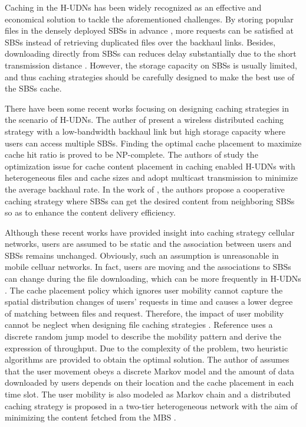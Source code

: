 \documentclass[conference]{IEEEtran}
\begin{document}
Caching in the H-UDNs has been widely recognized as an effective and economical solution to tackle the aforementioned challenges. By storing popular files in the densely deployed SBSs in advance \cite{8269405}, more requests can be satisfied at SBSs instead of retrieving duplicated files over the backhaul links. Besides, downloading directly from SBSs can reduces delay substantially due to the short transmission distance \cite{6736753}. However, the storage capacity on SBSs is usually limited, and thus caching strategies should be carefully designed to make the best use of the SBSs cache.

There have been some recent works focusing on designing caching strategies in the scenario of H-UDNs. The auther of \cite{6600983} present a wireless distributed caching strategy with a low-bandwidth backhaul link but high storage capacity where users can access multiple SBSs. Finding the optimal cache placement to maximize cache hit ratio is proved to be NP-complete. The authors of \cite{6952688} study the optimization issue for cache content placement in caching enabled H-UDNs with heterogeneous files and cache sizes and adopt multicast transmission to minimize the average backhaul rate. In the work of \cite{8116421}, the authors propose a cooperative caching strategy where SBSs can get the desired content from neighboring SBSs so as to enhance the content delivery efficiency.

Although these recent works have provided insight into caching strategy cellular networks, users are assumed to be static and the association between users and SBSs remains unchanged. Obviously, such an assumption is unreasonable in mobile celluar networks. In fact, users are moving and the associations to SBSs can change during the file downloading, which can be more frequently in H-UDNs \cite{7268835}. The cache placement policy which ignores user mobility cannot capture the spatial distribution changes of users' requests in time and causes a lower degree of matching between files and request. Therefore, the impact of user mobility cannot be neglect when designing file caching strategies \cite{7537180}. Reference \cite{8013789} uses a discrete random jump model to describe the mobility pattern and derive the expression of throughput. Due to the complexity of the problem, two heuristic algorithms are provided to obtain the optimal solution. The author of \cite{6620380} assumes that the user movement obeys a discrete Markov model and the amount of data downloaded by users depends on their location and the cache placement in each time slot. The user mobility is also modeled as Markov chain and a distributed caching strategy is proposed in a two-tier heterogeneous network with the aim of minimizing the content fetched from the MBS \cite{7484297}.
\end{document}
